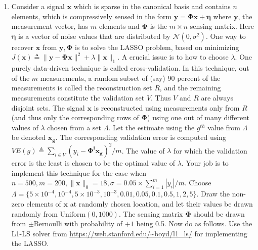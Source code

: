 \documentclass[11pt]{article}
\begin{document}
\begin{enumerate}
\item Consider a signal $\boldsymbol{x}$ which is sparse in the canonical basis and contains $n$ elements, which is compressively sensed in the form $\boldsymbol{y} = \boldsymbol{\Phi x} + \boldsymbol{\eta}$ where $\boldsymbol{y}$, the measurement vector, has $m$ elements and $\boldsymbol{\Phi}$ is the $m \times n$ sensing matrix. Here $\boldsymbol{\eta}$ is a vector of noise values that are distributed by $\mathcal{N}(0,\sigma^2)$.  One way to recover $\boldsymbol{x}$ from $\boldsymbol{y}, \boldsymbol{\Phi}$ is to solve the LASSO problem, based on minimizing $J(\boldsymbol{x}) \triangleq \|\boldsymbol{y}-\boldsymbol{\Phi x}\|^2 + \lambda \|\boldsymbol{x}\|_1$. A crucial issue is to how to choose $\lambda$. One purely data-driven technique is called cross-validation. In this technique, out of the $m$ measurements, a random subset of (say) 90 percent of the measurements is called the reconstruction set $R$, and the remaining measurements constitute the validation set $V$. Thus $V$ and $R$ are always disjoint sets. The signal $\boldsymbol{x}$ is reconstructed using measurements only from $R$ (and thus only the corresponding rows of $\boldsymbol{\Phi}$) using one out of many different values of $\lambda$ chosen from a set $\Lambda$. Let the estimate using the $g^{th}$ value from $\Lambda$ be denoted $\boldsymbol{x_g}$. The corresponding validation error is computed using $VE(g) \triangleq \sum_{i \in V} (y_i - \boldsymbol{\Phi^i x_g})^2/m$. The value of $\lambda$ for which the validation error is the least is chosen to be the optimal value of $\lambda$. Your job is to implement this technique for the case when $n = 500, m = 200, \|\boldsymbol{x}\|_0 = 18, \sigma = 0.05 \times \sum_{i=1}^m |y_i| / m$. Choose $\Lambda = \{5 \times 10^{-4}, 10^{-4}, 5 \times 10^{-3}, 10^{-3}, 0.01, 0.05, 0.1, 0.5, 1, 2, 5\}$. Draw the non-zero elements of $\boldsymbol{x}$ at randomly chosen location, and let their values be drawn randomly from $\textrm{Uniform}(0,1000)$. The sensing matrix $\boldsymbol{\Phi}$ should be drawn from $\pm \textrm{Bernoulli}$ with probability of $+1$ being 0.5. Now do as follows. Use the L1-LS solver from \url{https://web.stanford.edu/~boyd/l1_ls/}  for implementing the LASSO. 


\end{enumerate}
\end{document}
